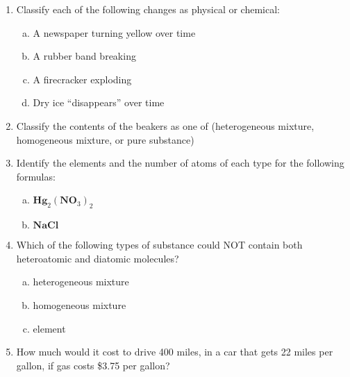 \documentclass{article}[12pt]
\begin{document}
\begin{enumerate}
\item Classify each of the following changes as physical or chemical:

\begin{enumerate}[a.]
  \item A newspaper turning yellow over time
  \item A rubber band breaking
  \item A firecracker exploding
  \item Dry ice ``disappears'' over time
\end{enumerate}

\item  Classify the contents of the beakers as one of (heterogeneous mixture, homogeneous mixture, or pure substance)


\item Identify the elements and the number of atoms of each type for
  the following formulas:
\begin{enumerate}[a.]
  \item  $\textbf{Hg}_2(\textbf{NO}_3)_2$
  \item  $\textbf{NaCl}$
\end{enumerate}

\item Which of the following types of substance could NOT contain both heteroatomic and diatomic molecules?
\begin{enumerate}[a.]
  \item  heterogeneous mixture
  \item  homogeneous mixture
  \item  element
\end{enumerate}

\item How much would it cost to drive 400 miles, in a car that gets 22 miles per gallon, if gas costs \$3.75 per gallon?
\end{enumerate}
\end{document}

